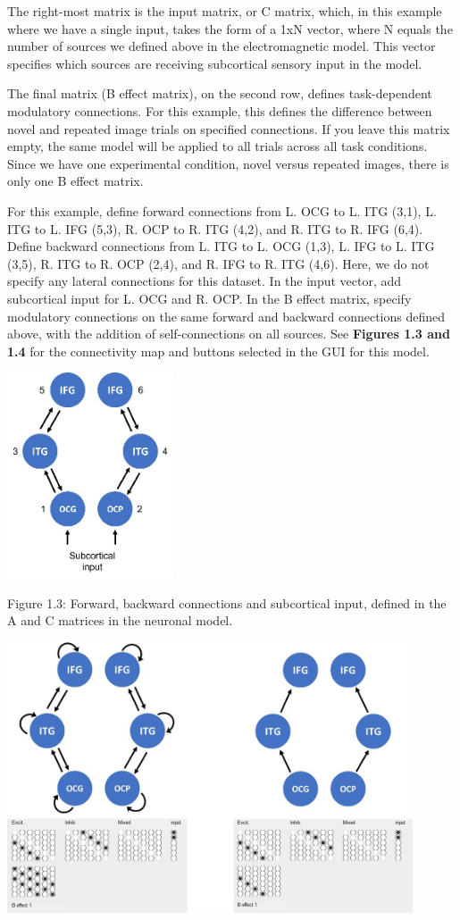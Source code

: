 The right-most matrix is the input matrix, or C matrix, which, in this
example where we have a single input, takes the form of a 1xN vector,
where N equals the number of sources we defined above in the
electromagnetic model. This vector specifies which sources are receiving
subcortical sensory input in the model.

The final matrix (B effect matrix), on the second row, defines
task-dependent modulatory connections. For this example, this defines
the difference between novel and repeated image trials on specified
connections. If you leave this matrix empty, the same model will be
applied to all trials across all task conditions. Since we have one
experimental condition, novel versus repeated images, there is only one
B effect matrix.

For this example, define forward connections from L. OCG to L. ITG
(3,1), L. ITG to L. IFG (5,3), R. OCP to R. ITG (4,2), and R. ITG to R.
IFG (6,4). Define backward connections from L. ITG to L. OCG (1,3), L.
IFG to L. ITG (3,5), R. ITG to R. OCP (2,4), and R. IFG to R. ITG (4,6).
Here, we do not specify any lateral connections for this dataset. In the
input vector, add subcortical input for L. OCG and R. OCP. In the B
effect matrix, specify modulatory connections on the same forward and
backward connections defined above, with the addition of
self-connections on all sources. See \textbf{Figures 1.3 and 1.4} for
the connectivity map and buttons selected in the GUI for this model.

\includegraphics[width=1.94167in,height=2.39288in]{A_C_matrices.png}

Figure 1.3: Forward, backward connections and subcortical input, defined
in the A and C matrices in the neuronal model.

\includegraphics[width=4.73175in,height=3.15694in]{B_matrix.png}

